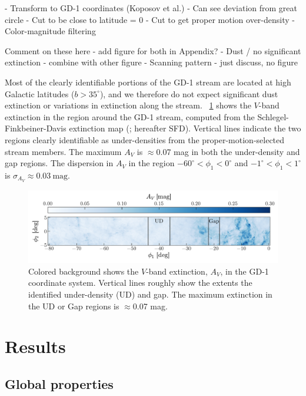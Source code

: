 \documentclass[modern]{aastex62}
\begin{document}
- Transform to GD-1 coordinates (Koposov et al.)
    - Can see deviation from great circle
- Cut to be close to latitude = 0
- Cut to get proper motion over-density
- Color-magnitude filtering

Comment on these here - add figure for both in Appendix?
- Dust / no significant extinction - combine with other figure
- Scanning pattern - just discuss, no figure

Most of the clearly identifiable portions of the GD-1 stream are located at high
Galactic latitudes ($b > 35^\circ$), and we therefore do not expect significant
dust extinction or variations in extinction along the stream.
\figurename~\ref{fig:sfd} shows the $V$-band extinction in the region around the
GD-1 stream, computed from the Schlegel-Finkbeiner-Davis extinction map
(\cite{Schlegel:1998}; hereafter SFD).
Vertical lines indicate the two regions clearly identifiable as under-densities
from the proper-motion-selected stream members.
The maximum $A_V$ is $\approx$0.07 mag in both the under-density and gap
regions.
The dispersion in $A_V$ in the region $-60^\circ < \phi_1 < 0^\circ$ and
$-1^\circ < \phi_1 < 1^\circ$ is $\sigma_{A_V} \approx 0.03~\textrm{mag}$.

\begin{figure}[h]
\begin{center}
\includegraphics[width=\textwidth]{sfd.pdf}
\end{center}
\caption{%
Colored background shows the $V$-band extinction, $A_V$, in the GD-1
coordinate system.
Vertical lines roughly show the extents the identified under-density (UD) and
gap.
The maximum extinction in the UD or Gap regions is $\approx$0.07 mag.
\label{fig:sfd}
}
\end{figure}


\section{Results}
\label{sec:results}

\subsection{Global properties}
\label{sec:res_global}
\end{document}
